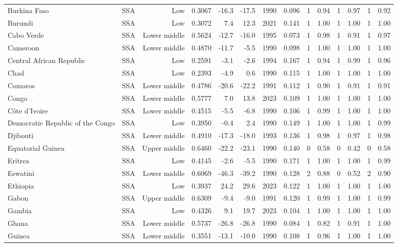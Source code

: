 \begin{longtable}{llrrrrrrrrrrrr}
Burkina Faso & SSA & Low & 0.3067 & -16.3 & -17.5 & 1990 & 0.096 & 1 & 0.94 & 1 & 0.97 & 1 & 0.92 \\
Burundi & SSA & Low & 0.3072 &   7.4 &  12.3 & 2021 & 0.141 & 1 & 1.00 & 1 & 1.00 & 1 & 1.00 \\
Cabo Verde & SSA & Lower middle & 0.5624 & -12.7 & -16.0 & 1995 & 0.073 & 1 & 0.98 & 1 & 0.91 & 1 & 0.97 \\
Cameroon & SSA & Lower middle & 0.4870 & -11.7 &  -5.5 & 1990 & 0.098 & 1 & 1.00 & 1 & 1.00 & 1 & 1.00 \\
Central African Republic & SSA & Low & 0.2591 &  -3.1 &  -2.6 & 1994 & 0.167 & 1 & 0.94 & 1 & 0.99 & 1 & 0.96 \\
Chad & SSA & Low & 0.2393 &  -4.9 &   0.6 & 1990 & 0.115 & 1 & 1.00 & 1 & 1.00 & 1 & 1.00 \\
Comoros & SSA & Lower middle & 0.4786 & -20.6 & -22.2 & 1991 & 0.112 & 1 & 0.90 & 1 & 0.91 & 1 & 0.91 \\
Congo & SSA & Lower middle & 0.5777 &   7.0 &  13.8 & 2023 & 0.109 & 1 & 1.00 & 1 & 1.00 & 1 & 1.00 \\
Côte d'Ivoire & SSA & Lower middle & 0.4515 &  -5.5 &  -6.8 & 1990 & 0.106 & 1 & 0.99 & 1 & 1.00 & 1 & 1.00 \\
Democratic Republic of the Congo & SSA & Low & 0.3950 &  -0.4 &   2.4 & 1990 & 0.149 & 1 & 1.00 & 1 & 1.00 & 1 & 0.99 \\
Djibouti & SSA & Lower middle & 0.4910 & -17.3 & -18.0 & 1993 & 0.136 & 1 & 0.98 & 1 & 0.97 & 1 & 0.98 \\
Equatorial Guinea & SSA & Upper middle & 0.6460 & -22.2 & -23.1 & 1990 & 0.140 & 0 & 0.58 & 0 & 0.42 & 0 & 0.58 \\
Eritrea & SSA & Low & 0.4145 &  -2.6 &  -5.5 & 1990 & 0.171 & 1 & 1.00 & 1 & 1.00 & 1 & 0.99 \\
Eswatini & SSA & Lower middle & 0.6069 & -46.3 & -39.2 & 1990 & 0.128 & 2 & 0.88 & 0 & 0.52 & 2 & 0.90 \\
Ethiopia & SSA & Low & 0.3937 &  24.2 &  29.6 & 2023 & 0.122 & 1 & 1.00 & 1 & 1.00 & 1 & 1.00 \\
Gabon & SSA & Upper middle & 0.6309 &  -9.4 &  -9.0 & 1991 & 0.120 & 1 & 0.99 & 1 & 1.00 & 1 & 0.99 \\
Gambia & SSA & Low & 0.4326 &   9.1 &  19.7 & 2023 & 0.104 & 1 & 1.00 & 1 & 1.00 & 1 & 1.00 \\
Ghana & SSA & Lower middle & 0.5737 & -26.8 & -26.8 & 1990 & 0.084 & 1 & 0.82 & 1 & 0.91 & 1 & 1.00 \\
Guinea & SSA & Lower middle & 0.3551 & -13.1 & -10.0 & 1990 & 0.108 & 1 & 0.96 & 1 & 1.00 & 1 & 1.00 \\

\end{longtable}
